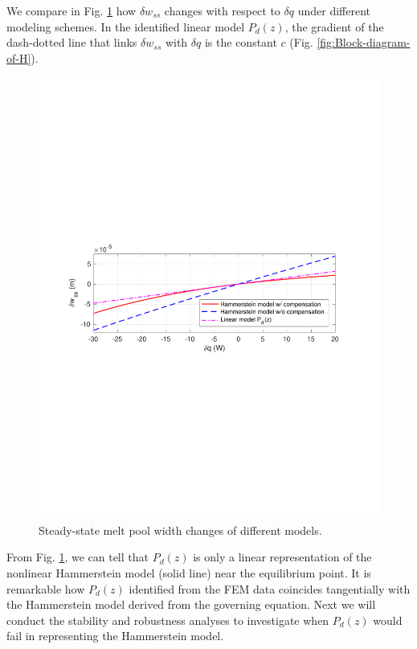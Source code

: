 \documentclass [11pt, proquest] {uwthesis}[2020/02/24]
\begin{document}
We compare in Fig. \ref{fig:Steady-state-melt-pool} how $\delta w_{ss}$
changes with respect to $\delta q$ under different modeling schemes.
In the identified linear model $P_{d}(z)$, the gradient of the dash-dotted
line that links $\delta w_{ss}$ with $\delta q$ is the constant
$c$ (Fig. \ref{fig:Block-diagram-of-H}). 
\begin{figure}[!ht]
\begin{centering}
\includegraphics[clip,width=13cm]{Hammerstein/deltaWss}
\par\end{centering}
\centering{}\caption{\label{fig:Steady-state-melt-pool}Steady-state melt pool width changes
of different models.}
\end{figure}
From Fig. \ref{fig:Steady-state-melt-pool}, we can tell that $P_{d}(z)$
is only a linear representation of the nonlinear Hammerstein model
(solid line) near the equilibrium point. It is remarkable how $P_{d}(z)$
identified from the FEM data coincides tangentially with the Hammerstein
model derived from the governing equation. Next we will conduct the
stability and robustness analyses to investigate when $P_{d}(z)$
would fail in representing the Hammerstein model.
\end{document}
